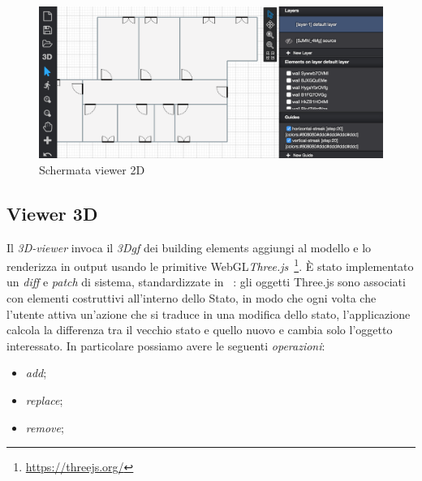 
\begin{figure}[htbp] %
   \centering
   \includegraphics[width=1\linewidth]{images/2d}
   \caption{Schermata viewer 2D}
   \label{fig:view2D}
\end{figure}
\newpage


\subsection{Viewer 3D}
Il \emph{3D-viewer} invoca il \emph{3Dgf} dei building elements aggiungi al modello e lo renderizza in output usando
le primitive WebGL\emph{Three.js}~\footnote{\url{https://threejs.org/}}. \`E stato implementato un \emph{diff} e \emph{patch} di
sistema, standardizzate in ~\cite{rfc6902}: gli oggetti Three.js sono associati con elementi costruttivi all'interno
dello Stato, in modo che ogni volta che l'utente attiva un'azione che si traduce in una modifica dello stato,
l'applicazione calcola la differenza tra il vecchio stato e quello nuovo e cambia solo l'oggetto interessato.
In particolare possiamo avere le seguenti \textit{operazioni}:
\begin{itemize}
  \item \emph{add};
  \item \emph{replace};
  \item \emph{remove};
\end{itemize}

